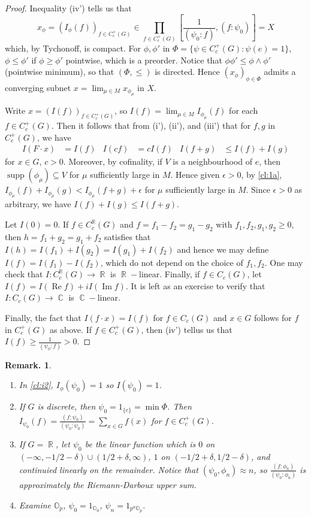 \documentclass[11pt, a4paper]{memoir}
\DeclareMathOperator{\R}{{\mathbb{R}}}
\DeclareMathOperator{\C}{{\mathbb{C}}}
\theoremstyle{change}
\theoremstyle{plain}
\theoremstyle{nonumberplain}
\newtheorem{remark}{Remark.}
\newtheorem{proof}{Proof}
\DeclareMathOperator{\supp}{supp}
\renewcommand{\Re}{\ensuremath{\operatorname{Re}}}
\renewcommand{\Im}{\ensuremath{\operatorname{Im}}}
\numberwithin{equation}{section}
\begin{document}
\begin{proof}
    Inequality (iv') tells us that
    \begin{equation*}
        x_\phi=(I_\phi(f))_{f\in C_c^+(G)}\in\prod_{f\in C_c^+(G)}[\frac{1}{(\psi_0:f)},(f:\psi_0)]=X
    \end{equation*}
    which, by Tychonoff, is compact.
    For $\phi,\phi'$ in $\Phi=\{\psi\in C_c^+(G):\psi(e)=1\}$, $\phi\leq\phi'$ if $\phi\geq\phi'$ pointwise, which is a preorder.
    Notice that $\phi\phi'\leq\phi\wedge\phi'$ (pointwise minimum), so that $(\Phi,\leq)$ is directed.
    Hence $(x_\phi)_{\phi\in\Phi}$ admits a converging subnet $x=\lim_{\mu\in M}x_{\phi_\mu}$ in $X$.

    Write $x=(I(f))_{f\in C_c^+(G)}$, so $I(f)=\lim_{\mu\in M}I_{\phi_\mu}(f)$ for each $f\in C_c^+(G)$.
    Then it follows that from (i'), (ii'), and (iii') that for $f,g$ in $C_c^+(G)$, we have
    \begin{align*}
        I(F\cdot x)&=I(f) & I(cf)&=cI(f) & I(f+g) &\leq I(f)+I(g)
    \end{align*}
    for $x\in G$, $c>0$.
    Moreover, by cofinality, if $V$ is a neighbourhood of $e$, then $\supp(\phi_\mu)\subseteq V$ for $\mu$ sufficiently large in $M$.
    Hence given $\epsilon>0$, by \cref{cl:1a}, $I_{\phi_\mu}(f)+I_{\phi_\mu}(g)<I_{\phi_\mu}(f+g)+\epsilon$ for $\mu$ sufficiently large in $M$.
    Since $\epsilon>0$ as arbitrary, we have $I(f)+I(g)\leq I(f+g)$.

    Let $I(0)=0$.
    If $f\in C_c^{\R}(G)$ and $f=f_1-f_2=g_1-g_2$ with $f_1,f_2,g_1,g_2\geq 0$, then $h=f_1+g_2=g_1+f_2$ satisfies that $I(h)=I(f_1)+I(g_2)=I(g_1)+I(f_2)$ and hence we may define $I(f)=I(f_1)-I(f_2)$, which do not depend on the choice of $f_1,f_2$.
    One may check that $I:C_c^{\R}(G)\to\R$ is $\R-$linear.
    Finally, if $f\in C_c(G)$, let $I(f)=I(\Re f)+iI(\Im f)$.
    It is left as an exercise to verify that $I:C_c(G)\to\C$ is $\C-$linear.

    Finally, the fact that $I(f\cdot x)=I(f)$ for $f\in C_c(G)$ and $x\in G$ follows for $f$ in $C_c^+(G)$ as above.
    If $f\in C_c^+(G)$, then (iv') tellus us that $I(f)\geq\frac{1}{(\psi_0:f)}>0$.
\end{proof}
\begin{remark}
    \begin{enumerate}[nl,r]
        \item In \cref{cl:i2}, $I_\phi(\psi_0)=1$ so $I(\psi_0)=1$.
        \item If $G$ is discrete, then $\psi_0=1_{\{e\}}=\min\Phi$.
            Then $I_{\psi_0}(f)=\frac{(f:\psi_0)}{(\psi_0:\psi_0)}=\sum_{x\in G}f(x)$ for $f\in C_c^+(G)$.
        \item If $G=\R$, let $\psi_0$ be the linear function which is $0$ on $(-\infty,-1/2-\delta)\cup(1/2+\delta,\infty)$, $1$ on $(-1/2+\delta,1/2-\delta)$, and continuied linearly on the remainder.
            Notice that $(\psi_0,\phi_n)\approx n$, so $\frac{(f:\phi_n)}{(\psi_0:\phi_n)}$ is approximately the Riemann-Darboux upper sum.
        \item Examine $\mathbb{O}_p$, $\psi_0=1_{\mathbb{O}_0}$, $\psi_n=1_{p^n\mathbb{O}_p}$.
    \end{enumerate}
\end{remark}
\end{document}
